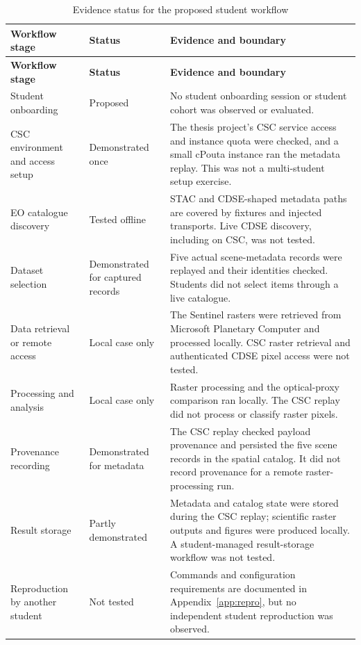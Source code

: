 \begin{longtable}{p{}p{}p{}}
\caption{Evidence status for the proposed student workflow}
\label{tab:csc-student-workflow}\\
\toprule
\textbf{Workflow stage} & \textbf{Status} & \textbf{Evidence and boundary} \\
\midrule
\endfirsthead
\toprule
\textbf{Workflow stage} & \textbf{Status} & \textbf{Evidence and boundary} \\
\midrule
\endhead
Student onboarding & Proposed & No student onboarding session or student cohort was observed or evaluated. \\
CSC environment and access setup & Demonstrated once & The thesis project's CSC service access and instance quota were checked, and a small cPouta instance ran the metadata replay. This was not a multi-student setup exercise. \\
EO catalogue discovery & Tested offline & STAC and CDSE-shaped metadata paths are covered by fixtures and injected transports. Live CDSE discovery, including on CSC, was not tested. \\
Dataset selection & Demonstrated for captured records & Five actual scene-metadata records were replayed and their identities checked. Students did not select items through a live catalogue. \\
Data retrieval or remote access & Local case only & The Sentinel rasters were retrieved from Microsoft Planetary Computer and processed locally. CSC raster retrieval and authenticated CDSE pixel access were not tested. \\
Processing and analysis & Local case only & Raster processing and the optical-proxy comparison ran locally. The CSC replay did not process or classify raster pixels. \\
Provenance recording & Demonstrated for metadata & The CSC replay checked payload provenance and persisted the five scene records in the spatial catalog. It did not record provenance for a remote raster-processing run. \\
Result storage & Partly demonstrated & Metadata and catalog state were stored during the CSC replay; scientific raster outputs and figures were produced locally. A student-managed result-storage workflow was not tested. \\
Reproduction by another student & Not tested & Commands and configuration requirements are documented in Appendix~\ref{app:repro}, but no independent student reproduction was observed. \\
\bottomrule
\end{longtable}

